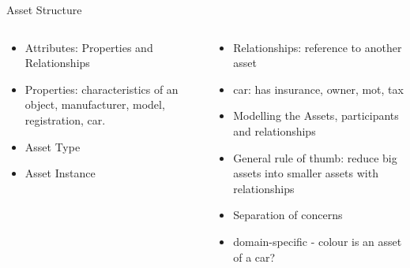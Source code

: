 \documentclass[pdf,table]{beamer}
\begin{document}
\begin{frame}{Asset Structure}
	\begin{columns}[T]
		\begin{column}{0.48\textwidth}
			\begin{itemize}
				\item Attributes: Properties and Relationships 
				\item Properties: characteristics of an object, manufacturer, model, registration, car.
				\item Asset Type
				\item Asset Instance
			\end{itemize}
		\end{column}
		\begin{column}{0.48\textwidth}
			\begin{itemize}
				\item Relationships: reference to another asset
				\item car: has insurance, owner, mot, tax
				\item Modelling the Assets, participants and relationships
				\item General rule of thumb: reduce big assets into smaller assets with relationships
				\item Separation of concerns
				\item domain-specific - colour is an asset of a car? %
			\end{itemize}
		\end{column}
	\end{columns}	
\end{frame}
\end{document}
